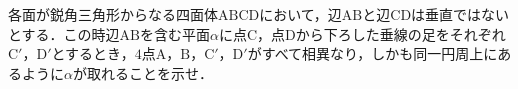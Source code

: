 \documentclass[../../main.tex]{subfiles}
\begin{document}
各面が鋭角三角形からなる四面体$\mathrm{ABCD}$において，辺$\mathrm{AB}$と辺$\mathrm{CD}$は垂直ではないとする．この時辺$\mathrm{AB}$を含む平面$\alpha$に点$\mathrm{C}$，点$\mathrm{D}$から下ろした垂線の足をそれぞれ$\mathrm{C}'$，$\mathrm{D}'$とするとき，$4$点$\mathrm{A}$，$\mathrm{B}$，$\mathrm{C}'$，$\mathrm{D}'$がすべて相異なり，しかも同一円周上にあるように$\alpha$が取れることを示せ．
\end{document}
